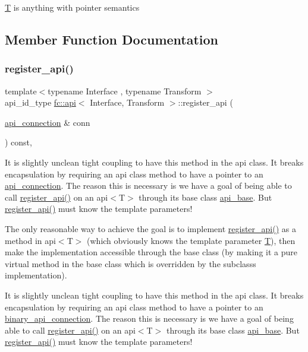 \mbox{\hyperlink{struct_t}{T}} is anything with pointer semantics 

\subsection{Member Function Documentation}
\mbox{\label{classfc_1_1api_a0fc48f47c158c42785ac9a7b21bf8788}} 
\subsubsection{\texorpdfstring{register\+\_\+api()}{register\_api()}}
{\footnotesize\ttfamily template$<$typename Interface , typename Transform $>$ \\
api\+\_\+id\+\_\+type \mbox{\hyperlink{classfc_1_1api}{fc\+::api}}$<$ Interface, Transform $>$\+::register\+\_\+api (\begin{DoxyParamCaption}\item[{\mbox{\hyperlink{classfc_1_1api__connection}{api\+\_\+connection}} \&}]{conn }\end{DoxyParamCaption}) const\hspace{0.3cm}{\ttfamily [override]}, {\ttfamily [virtual]}}

It is slightly unclean tight coupling to have this method in the api class. It breaks encapsulation by requiring an api class method to have a pointer to an \mbox{\hyperlink{classfc_1_1api__connection}{api\+\_\+connection}}. The reason this is necessary is we have a goal of being able to call \mbox{\hyperlink{classfc_1_1api_a0fc48f47c158c42785ac9a7b21bf8788}{register\+\_\+api()}} on an api$<$\+T$>$ through its base class \mbox{\hyperlink{classfc_1_1api__base}{api\+\_\+base}}. But \mbox{\hyperlink{classfc_1_1api_a0fc48f47c158c42785ac9a7b21bf8788}{register\+\_\+api()}} must know the template parameters!

The only reasonable way to achieve the goal is to implement \mbox{\hyperlink{classfc_1_1api_a0fc48f47c158c42785ac9a7b21bf8788}{register\+\_\+api()}} as a method in api$<$\+T$>$ (which obviously knows the template parameter \mbox{\hyperlink{struct_t}{T}}), then make the implementation accessible through the base class (by making it a pure virtual method in the base class which is overridden by the subclass\textquotesingle{}s implementation).

It is slightly unclean tight coupling to have this method in the api class. It breaks encapsulation by requiring an api class method to have a pointer to an \mbox{\hyperlink{classfc_1_1binary__api__connection}{binary\+\_\+api\+\_\+connection}}. The reason this is necessary is we have a goal of being able to call \mbox{\hyperlink{classfc_1_1api_a0fc48f47c158c42785ac9a7b21bf8788}{register\+\_\+api()}} on an api$<$\+T$>$ through its base class \mbox{\hyperlink{classfc_1_1api__base}{api\+\_\+base}}. But \mbox{\hyperlink{classfc_1_1api_a0fc48f47c158c42785ac9a7b21bf8788}{register\+\_\+api()}} must know the template parameters!

